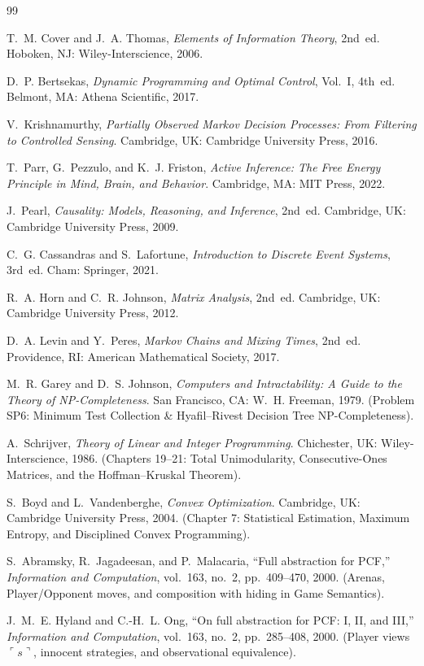 \documentclass[11pt,a4paper]{article}
\theoremstyle{definition}
\theoremstyle{remark}
\begin{document}
\begin{thebibliography}{99}

T.~M. Cover and J.~A. Thomas, \emph{Elements of Information Theory}, 2nd~ed. Hoboken, NJ: Wiley-Interscience, 2006.

D.~P. Bertsekas, \emph{Dynamic Programming and Optimal Control}, Vol.~I, 4th~ed. Belmont, MA: Athena Scientific, 2017.

V.~Krishnamurthy, \emph{Partially Observed Markov Decision Processes: From Filtering to Controlled Sensing}. Cambridge, UK: Cambridge University Press, 2016.

T.~Parr, G.~Pezzulo, and K.~J. Friston, \emph{Active Inference: The Free Energy Principle in Mind, Brain, and Behavior}. Cambridge, MA: MIT Press, 2022.

J.~Pearl, \emph{Causality: Models, Reasoning, and Inference}, 2nd~ed. Cambridge, UK: Cambridge University Press, 2009.

C.~G. Cassandras and S.~Lafortune, \emph{Introduction to Discrete Event Systems}, 3rd~ed. Cham: Springer, 2021.

R.~A. Horn and C.~R. Johnson, \emph{Matrix Analysis}, 2nd~ed. Cambridge, UK: Cambridge University Press, 2012.

D.~A. Levin and Y.~Peres, \emph{Markov Chains and Mixing Times}, 2nd~ed. Providence, RI: American Mathematical Society, 2017.

M.~R. Garey and D.~S. Johnson, \emph{Computers and Intractability: A Guide to the Theory of NP-Completeness}. San Francisco, CA: W.~H. Freeman, 1979. (Problem SP6: Minimum Test Collection \& Hyafil--Rivest Decision Tree NP-Completeness).

A.~Schrijver, \emph{Theory of Linear and Integer Programming}. Chichester, UK: Wiley-Interscience, 1986. (Chapters 19--21: Total Unimodularity, Consecutive-Ones Matrices, and the Hoffman--Kruskal Theorem).

S.~Boyd and L.~Vandenberghe, \emph{Convex Optimization}. Cambridge, UK: Cambridge University Press, 2004. (Chapter 7: Statistical Estimation, Maximum Entropy, and Disciplined Convex Programming).

S.~Abramsky, R.~Jagadeesan, and P.~Malacaria, ``Full abstraction for PCF,'' \emph{Information and Computation}, vol.~163, no.~2, pp.~409--470, 2000. (Arenas, Player/Opponent moves, and composition with hiding in Game Semantics).

J.~M.~E. Hyland and C.-H.~L. Ong, ``On full abstraction for PCF: I, II, and III,'' \emph{Information and Computation}, vol.~163, no.~2, pp.~285--408, 2000. (Player views $\ulcorner s \urcorner$, innocent strategies, and observational equivalence).

\end{thebibliography}
\end{document}
